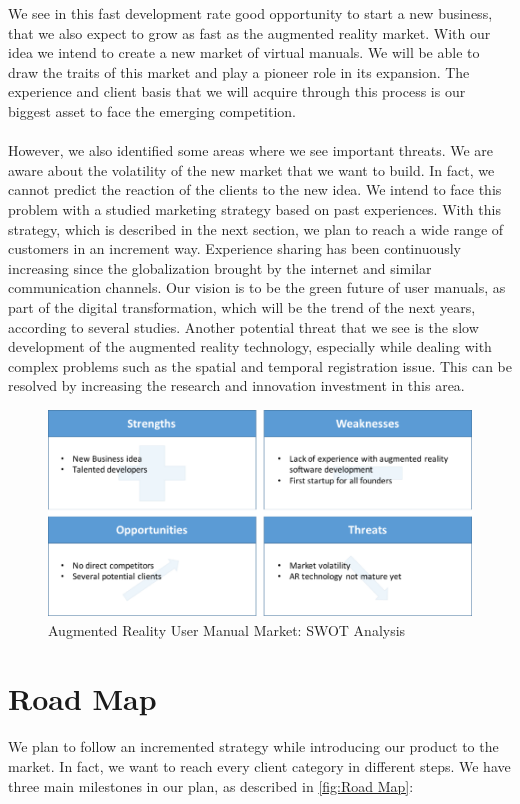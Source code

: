 	We see in this fast development rate good opportunity to start a new business, that we also expect to grow as fast as the augmented reality market. With our idea we intend to create a new market of virtual manuals. We will be able to draw the traits of this market and play a pioneer role in its expansion. The experience and client basis that we will acquire through this process is our biggest asset to face the emerging competition. \\
	\\
	However, we also identified some areas where we see important threats. We are aware about the volatility of the new market that we want to build. In fact, we cannot predict the reaction of the clients to the new idea. We intend to face this problem with a studied marketing strategy based on past experiences. With this strategy, which is described in the next section, we plan to reach a wide range of customers in an increment way. Experience sharing has been continuously increasing since the globalization brought by the internet and similar communication channels. Our vision is to be the green future of user manuals, as part of the digital transformation, which will be the trend of the next years, according to several studies. Another potential threat that we see is the slow development of the augmented reality technology, especially while dealing with complex problems such as the spatial and temporal registration issue. This can be resolved by increasing the research and innovation investment in this area. 
\begin{figure}[H]
		\includegraphics[width=\textwidth]{../images/SWOTanalysis.png}
		\centering
		\caption[Augmented Reality User Manual Market: SWOT Analysis]{Augmented Reality User Manual Market: SWOT Analysis}
		\label{fig:SWOT}
\end{figure}

\section{Road Map}
We plan to follow an incremented strategy while introducing our product to the market. In fact, we want to reach every client category in different steps. We have three main milestones in our plan, as described in \autoref{fig:Road Map}:

